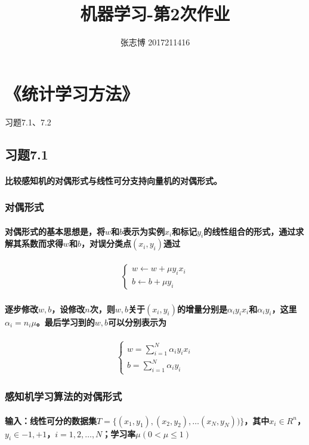 \documentclass[UTF8]{ctexart}
\author{张志博 2017211416}
\title{机器学习-第2次作业}
\begin{document}
\maketitle

\section{《统计学习方法》}习题7.1、7.2
\subsection{习题7.1}
\paragraph{比较感知机的对偶形式与线性可分支持向量机的对偶形式。}
\subsubsection{对偶形式}
\paragraph{对偶形式的基本思想是，将$w$和$b$表示为实例$x_i$和标记$y_i$的线性组合的形式，通过求解其系数而求得$w$和$b$，对误分类点$(x_i,y_i)$通过}
\begin{align*}
    \begin{cases}
        w\leftarrow w+\mu y_{i}x_{i} \\
        b\leftarrow b+\mu y_{i}
    \end{cases}
\end{align*}
\paragraph{逐步修改$w,b$，设修改$n$次，则$w,b$关于$(x_i,y_i)$的增量分别是$\alpha_{i}y_{i}x_{i}$和$\alpha_{i}y_{i}$，这里$\alpha_{i}=n_{i}\mu$。最后学习到的$w,b$可以分别表示为}
\begin{align*}
    \begin{cases}
        w=\sum\limits_{i=1}^{N}\alpha_{i}y_{i}x_{i} \\
        b=\sum\limits_{i=1}^{N}\alpha_{i}y_{i}
    \end{cases}
\end{align*}

\subsubsection{感知机学习算法的对偶形式}
\paragraph{输入：线性可分的数据集$T=\{(x_1,y_1),(x_2,y_2),\dots(x_N,y_N))\}$，其中$x_i\in R^n$，$y_i\in {-1,+1}$，$i=1,2,\dots,N$；学习率$\mu(0<\mu\le 1)$}
\end{document}
